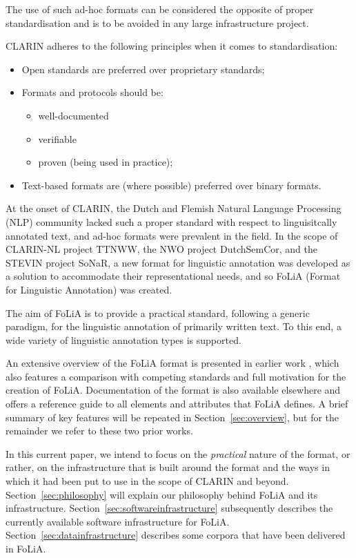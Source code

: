 \documentclass[a4paper,11pt]{article}
\begin{document}
The use of such ad-hoc formats can be considered the opposite of proper
standardisation and is to be avoided in any large infrastructure project. 

CLARIN adheres to the following principles when it comes to standardisation:

\begin{itemize}
    \item Open standards are preferred over proprietary standards;
    \item Formats and protocols should be:
    \begin{itemize}
        \item well-documented
        \item verifiable
        \item proven (being used in practice);
    \end{itemize}
    \item Text-based formats are (where possible) preferred over binary formats.
\end{itemize}

At the onset of CLARIN, the Dutch and Flemish Natural Language Processing (NLP)
community lacked such a proper standard with respect to linguisitcally
annotated text, and ad-hoc formats were prevalent in the field.  In the scope
of CLARIN-NL project TTNWW, the NWO project DutchSemCor, and the STEVIN project
SoNaR, a new format for linguistic annotation was developed as a solution to
accommodate their representational needs, and so FoLiA (Format for Linguistic
Annotation) was created.

The aim of FoLiA is to provide a practical standard, following a generic
paradigm, for the linguistic annotation of primarily written text. To this end,
a wide variety of linguistic annotation types is supported. 

An extensive overview of the FoLiA format is presented in earlier work \cite{FOLIACLIN2013},
which also features a comparison with competing standards and full motivation
for the creation of FoLiA. Documentation of the format is also available
elsewhere \cite{FOLIADOC2014} and offers a reference guide to all elements and attributes
that FoLiA defines.  A brief summary of key features will be repeated in
Section~\ref{sec:overview}, but for the remainder we refer to these two prior
works.

In this current paper, we intend to focus on the \emph{practical} nature of the
format, or rather, on the infrastructure that is built around the format and
the ways in which it had been put to use in the scope of CLARIN and beyond.
Section~\ref{sec:philosophy} will explain our philosophy behind FoLiA and its
infrastructure. Section~\ref{sec:softwareinfrastructure} subsequently describes
the currently available software infrastructure for FoLiA.
Section~\ref{sec:datainfrastructure} describes some corpora that have been
delivered in FoLiA.
\end{document}
